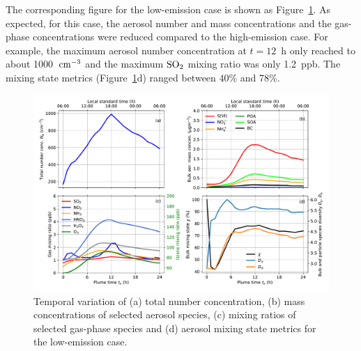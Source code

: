 \documentclass[edeposit,fullpage]{uiucthesis2009}
\begin{document}
The corresponding figure for the low-emission case is shown as
Figure~\ref{fig:sup1}. As expected, for
this case, the aerosol number and mass concentrations and the
gas-phase concentrations were reduced compared to the high-emission
case. For example, the maximum aerosol number concentration at
$t=12$~h only reached to about 1000~$\rm cm^{-3}$ and the maximum $\rm
SO_2$ mixing ratio was only 1.2~ppb. The mixing state metrics
(Figure~\ref{fig:sup1}d) ranged between 40\% and 78\%.
  
  \begin{figure}
    \centering
    \includegraphics[scale=0.5]{chap3_figs/fig_sup1.pdf}
    \caption{Temporal variation of (a) total number concentration, (b)
      mass concentrations of selected aerosol species, (c) mixing
      ratios of selected gas-phase species and (d) aerosol mixing
      state metrics for the low-emission case.}
    \label{fig:sup1}
\end{figure}
\end{document}
